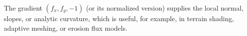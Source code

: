 The gradient $(f_x,f_y,-1)$ (or its normalized version) supplies the local normal, slopes, or analytic curvature, which is useful, for example, in terrain  shading, adaptive meshing, or erosion flux models.




















